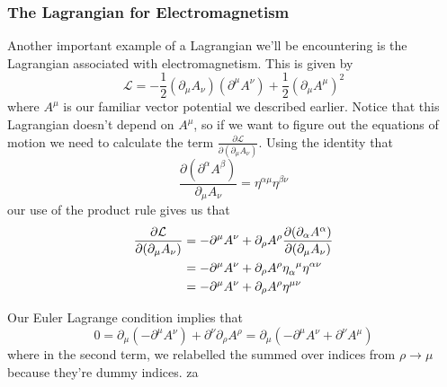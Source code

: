 \subsubsection{The Lagrangian for Electromagnetism} 
Another important example of a Lagrangian we'll be encountering is the Lagrangian associated with electromagnetism. This is given by 
\[ 
\mathcal{L}  =  - \frac{1}{2} ( \partial_\mu A_\nu)( \partial^\mu A^\nu )   + \frac{1}{ 2} ( \partial_\mu A^\mu)^2 
\] 
where $A^\mu$ is our familiar vector potential we described earlier. Notice that this Lagrangian doesn't depend on $A^\mu$, so if we want to figure out the equations of motion we need to calculate the term $ \frac{ \partial \mathcal{L} } {\partial (\partial_\mu A_\nu) } $. Using the identity that 
\[ 
\frac{ \partial (\partial^\alpha A^\beta) }{ \partial_\mu A_\nu } = \eta^{ \alpha \mu} \eta^{ \beta \nu } 
\] our use of the product rule gives us that 
\begin{align*} 
\frac{ \partial \mathcal{L}}{\partial ( \partial_\mu A_\nu ) } & = - \partial^\mu A^\nu + \partial_\rho A^\rho \frac{ \partial ( \partial_\alpha A^\alpha ) }{ \partial ( \partial_\mu A_\nu ) }   \\
&=  -\partial^\mu A^\nu + \partial_\rho A^\rho \eta\indices{_\alpha^\mu} \eta\indices{^\alpha^\nu} \\
&=  -\partial^\mu A^\nu + \partial_\rho A^\rho \eta^{ \mu \nu } 
\end{align*} 

Our Euler Lagrange condition implies that 
\[ 
0 = \partial_\mu (  - \partial^\mu A^\nu)  + \partial^\nu \partial_\rho A^\rho = \partial_\mu (  - \partial^\mu A^\nu + \partial ^\nu A^\mu ) 
\] 
where in the second term, we relabelled the summed over indices from $\rho \rightarrow \mu$ because they're dummy indices.  
za
